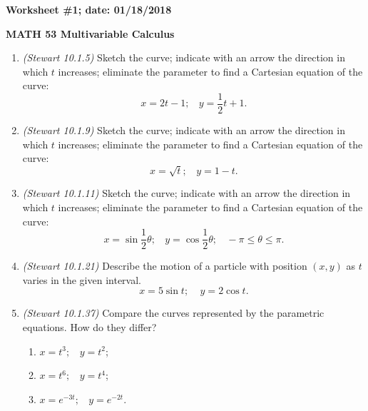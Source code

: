 \documentclass{article}
\begin{document}
{\bf Worksheet \#1; date: 01/18/2018}

{\bf MATH 53 Multivariable Calculus}

\begin{enumerate}
\item {\em (Stewart 10.1.5)} Sketch the curve; indicate with an arrow the direction in which $t$ increases; eliminate the parameter to find a Cartesian equation of the curve:
\[
x = 2t - 1; ~~~~ y = \frac{1}{2}t + 1.
\]
\item {\em (Stewart 10.1.9)} Sketch the curve; indicate with an arrow the direction in which $t$ increases; eliminate the parameter to find a Cartesian equation of the curve:
\[
x = \sqrt{t}; ~~~~ y = 1 - t.
\]
\item {\em (Stewart 10.1.11)} Sketch the curve; indicate with an arrow the direction in which $t$ increases; eliminate the parameter to find a Cartesian equation of the curve:
\[
x = \sin \frac{1}{2} \theta; ~~~~ y = \cos \frac{1}{2} \theta; ~~~~ -\pi \le \theta \le \pi.
\]
\item {\em (Stewart 10.1.21)} Describe the motion of a particle with position $(x, y)$ as $t$ varies in the given interval.
\[
x = 5 \sin t; ~~~~~ y = 2 \cos t.
\]
\item {\em (Stewart 10.1.37)} Compare the curves represented by the parametric equations. How do they differ?
\begin{enumerate}
\item $x = t^3; ~~~~ y = t^2$;
\item $x = t^6; ~~~~ y = t^4$;
\item $x = e^{-3t}; ~~~~ y = e^{-2t}$.
\end{enumerate}
\end{enumerate}
\end{document}
